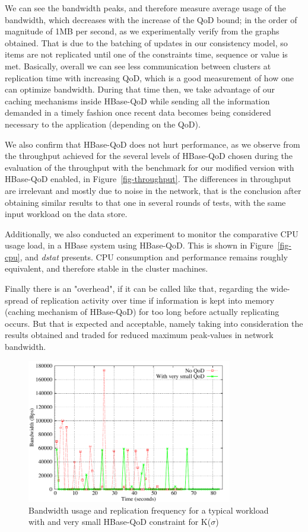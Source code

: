 We can see the bandwidth peaks, and therefore measure average usage of the bandwidth, which decreases with the increase of the QoD bound; in the order of magnitude of 1MB per second, as we experimentally verify from the graphs obtained. That is due to the batching of updates in our consistency model, so items are not replicated until one of the constraints time, sequence or value is met. Basically, overall we can see less communication between clusters at replication time with increasing QoD, which is a good measurement of how one can optimize bandwidth. During that time then, we take advantage of our caching mechanisms inside HBase-QoD while sending all the information demanded in a timely fashion once recent data becomes being considered necessary to the application (depending on the QoD).

We also confirm that HBase-QoD does not hurt performance, as we observe from the throughput achieved for the several levels of HBase-QoD chosen during the evaluation of the throughput with the benchmark for our modified version with HBase-QoD enabled, in Figure~\ref{fig-throughput}. The differences in throughput are irrelevant and mostly due to noise in the network, that is the conclusion after obtaining similar results to that one in several rounds of tests, with the same input workload on the data store.

Additionally, we also conducted an experiment to monitor the comparative CPU usage load, in a HBase system using HBase-QoD. This is shown in Figure~\ref{fig-cpu}, and \emph{dstat} presents. CPU consumption and performance remains roughly equivalent, and therefore stable in the cluster machines.

Finally there is an "overhead", if it can be called like that, regarding the wide-spread of replication activity over time if information is kept into memory (caching mechanism of HBase-QoD) for too long before actually replicating occurs. But that is expected and acceptable, namely taking into consideration the results obtained and traded for reduced maximum peak-values in network bandwidth.

\begin{figure}[b]
\centering
\includegraphics[width=0.8\textwidth]{figs/bandwidth.pdf}
\caption{Bandwidth usage and replication frequency for a typical workload with and very small HBase-QoD constraint for K($\sigma$)}
\label{fig-bw-freq}
\end{figure}

